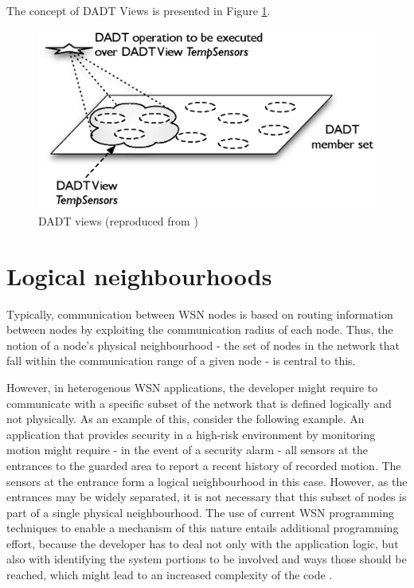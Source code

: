 The concept of DADT Views is presented in Figure \ref{Fig:DADT_Views}.

\begin{figure}
\centering
\includegraphics[scale=0.71]{img/DADT_Views.eps} 
\caption[DADT Views]{DADT views (reproduced from \cite{migliavacca_DADT:2006})}
\label{Fig:DADT_Views}
\end{figure}

\section {Logical neighbourhoods} \label{LNDescription}

Typically, communication between WSN nodes is based on routing 
information between nodes by exploiting the communication radius of each node.
Thus, the notion of a node's physical neighbourhood - the set of nodes in the
network that fall within the communication range of a given node - is central to this.

However, in heterogenous WSN applications, the developer might require to
communicate with a specific subset of the network that is defined logically and
not physically. As an example of this, consider the following example. An
application that provides security in a high-risk environment by monitoring 
motion might require - in the event of a security alarm - all sensors at the
entrances to the guarded area to report a recent history of recorded motion.
The sensors at the entrance form a logical neighbourhood in this case. However,
as the entrances may be widely separated, it is not necessary that this subset
of nodes is part of a single physical neighbourhood. The use of current WSN
programming techniques to enable a mechanism of this nature entails additional
programming effort, because the developer has to deal not only with
the application logic, but also with identifying the system portions to be
involved and ways those should be reached, which might lead to an
increased complexity of the code \cite{mottola_LN:2006}.  

